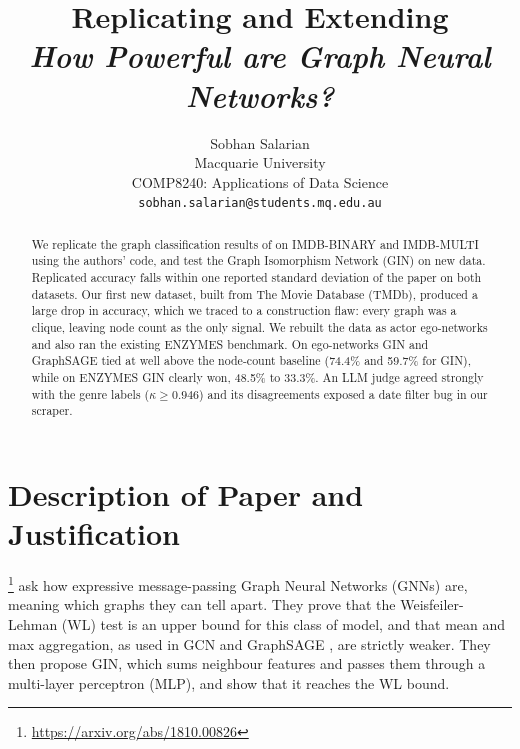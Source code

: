 \documentclass[11pt]{article}
\title{Replicating and Extending \\ \textit{How Powerful are Graph Neural Networks?}}
\author{
  Sobhan Salarian \\
  Macquarie University \\
  COMP8240: Applications of Data Science \\
  \texttt{sobhan.salarian@students.mq.edu.au}
}
\begin{document}
\raggedbottom
\maketitle

\begin{abstract}
We replicate the graph classification results of \citet{xu2019gin} on IMDB-BINARY and IMDB-MULTI using the authors' code, and test the Graph Isomorphism Network (GIN) on new data. Replicated accuracy falls within one reported standard deviation of the paper on both datasets. Our first new dataset, built from The Movie Database (TMDb), produced a large drop in accuracy, which we traced to a construction flaw: every graph was a clique, leaving node count as the only signal. We rebuilt the data as actor ego-networks and also ran the existing ENZYMES benchmark. On ego-networks GIN and GraphSAGE tied at well above the node-count baseline (74.4\% and 59.7\% for GIN), while on ENZYMES GIN clearly won, 48.5\% to 33.3\%. An LLM judge agreed strongly with the genre labels ($\kappa \geq 0.946$) and its disagreements exposed a date filter bug in our scraper.
\end{abstract}

\section{Description of Paper and Justification}
\label{sec:paper}

\citet{xu2019gin}\footnote{\url{https://arxiv.org/abs/1810.00826}} ask how expressive message-passing Graph Neural Networks (GNNs) are, meaning which graphs they can tell apart. They prove that the Weisfeiler-Lehman (WL) test \citep{weisfeiler1968reduction} is an upper bound for this class of model, and that mean and max aggregation, as used in GCN \citep{kipf2017gcn} and GraphSAGE \citep{hamilton2017graphsage}, are strictly weaker. They then propose GIN, which sums neighbour features and passes them through a multi-layer perceptron (MLP), and show that it reaches the WL bound.
\end{document}
